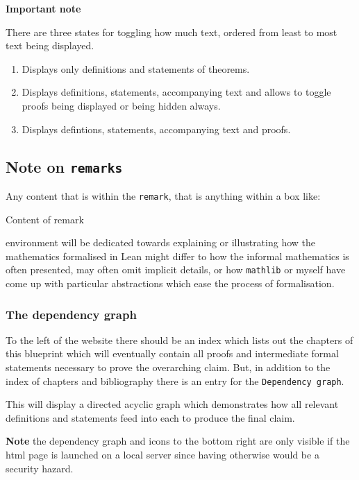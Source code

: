 \textbf{Important note}

There are three states for toggling how much text, ordered from least to most text being displayed.

\begin{enumerate}
    \item Displays only definitions and statements of theorems.
    \item Displays definitions, statements, accompanying text and allows to toggle proofs being displayed or being hidden always.
    \item Displays defintions, statements, accompanying text and proofs.
\end{enumerate}

\subsection{Note on \texttt{remarks}}

Any content that is within the \texttt{remark}, that is anything within a box like:

\begin{remark}[A remark]
    Content of remark
\end{remark}

environment will be dedicated towards explaining or illustrating how the mathematics formalised in Lean might differ to 
how the informal mathematics is often presented, may often omit implicit details, or how \texttt{mathlib} or myself have come up with particular
abstractions which ease the process of formalisation.

\subsubsection{The dependency graph}

To the left of the website there should be an index which lists out the chapters of this blueprint which will eventually contain all proofs and intermediate formal statements necessary
to prove the overarching claim. But, in addition to the index of chapters and bibliography there is an entry for the \texttt{Dependency graph}.

This will display a directed acyclic graph which demonstrates how all relevant definitions and statements feed into each to produce the final claim.

\textbf{Note} the dependency graph and icons to the bottom right are only visible if the html page is launched on a local server since
having otherwise would be a security hazard.

